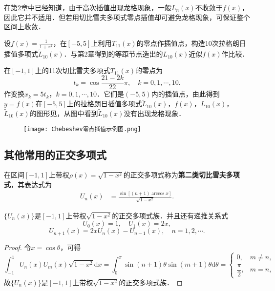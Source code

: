 \documentclass[../../main.tex]{subfiles}
\begin{document}
在\hyperref[高次插值导致的龙格现象]{第2章}中已经知道，由于高次插值出现龙格现象，一般$L_n(x)$不收敛于$f(x)$，因此它并不适用．但若用切比雪夫多项式零点插值却可避免龙格现象，可保证整个区间上收敛．

\begin{example}
设$f(x) = \frac{1}{1 + x^2}$，在$[-5,5]$上利用$T_{11}(x)$的零点作插值点，构造10次拉格朗日插值多项式$\widetilde{L}_{10}(x)$．与第2章得到的等距节点造出的$L_{10}(x)$近似$f(x)$作比较．
\end{example}
\begin{solution}
在$[-1,1]$上的11次切比雪夫多项式$T_{11}(x)$的零点为
$$t_k = \cos\frac{21 - 2k}{22}\pi,\quad k = 0,1,\cdots,10.$$
作变换$x_k = 5t_k$，$k = 0,1,\cdots,10$．它们是$(-5,5)$内的插值点，由此得到$y = f(x)$在$[-5,5]$上的拉格朗日插值多项式$\widetilde{L}_{10}(x)$，$f(x)$，$L_{10}(x)$，$\widetilde{L}_{10}(x)$的图形见，从图中看到$\widetilde{L}_{10}(x)$没有出现龙格现象．
\begin{figure}[H]
\centering
\texttt{[image: Chebeshev零点插值示例图.png]}
\caption{}
\label{figure:Chebeshev零点插值示例图}
\end{figure}

\end{solution}


\subsection{其他常用的正交多项式}

\begin{definition}[第二类切比雪夫多项式]\label{definition:第二类切比雪夫多项式}
在区间$[-1,1]$上带权$\rho(x) = \sqrt{1 - x^2}$的正交多项式称为\textbf{第二类切比雪夫多项式}，其表达式为
\begin{align}\label{eq:数值分析-3-2.16}
U_n(x) &= \frac{\sin[(n + 1)\arccos x]}{\sqrt{1 - x^2}}.
\end{align}
\end{definition}

\begin{theorem}
$\{U_n(x)\}$是$[-1,1]$上带权$\sqrt{1 - x^2}$的正交多项式族．并且还有递推关系式
$$U_0(x) = 1,\quad U_1(x) = 2x,$$
$$U_{n+1}(x) = 2xU_n(x) - U_{n-1}(x),\quad n = 1,2,\cdots.$$
\end{theorem}
\begin{proof}
令$x = \cos\theta$，可得
$$\int_{-1}^1 U_n(x)U_m(x)\sqrt{1 - x^2}\mathrm{d}x = \int_0^\pi \sin(n + 1)\theta\sin(m + 1)\theta\mathrm{d}\theta =
\begin{cases}
0, & m \neq n, \\
\dfrac{\pi}{2}, & m = n,
\end{cases}$$
故$\{U_n(x)\}$是$[-1,1]$上带权$\sqrt{1 - x^2}$的正交多项式族．

\end{proof}
\end{document}
